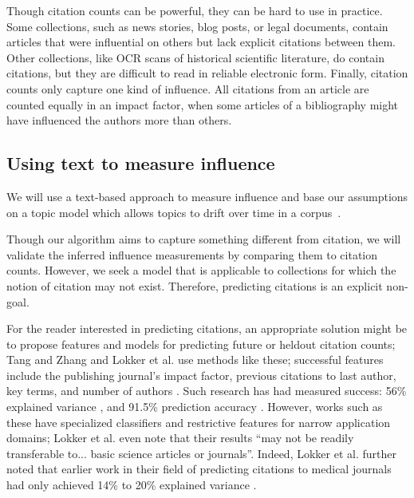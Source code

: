 Though citation counts can be powerful, they can be hard to use in
practice.  Some collections, such as news stories, blog posts, or
legal documents, contain articles that were influential on others but
lack explicit citations between them.  Other collections, like OCR
scans of historical scientific literature, do contain citations, but
they are difficult to read in reliable electronic form.  Finally,
citation counts only capture one kind of influence.  All citations
from an article are counted equally in an impact factor, when some
articles of a bibliography might have influenced the authors more than
others.

\subsection*{Using text to measure influence}

We will use a text-based approach to measure influence and base our
assumptions on a topic model which allows topics to drift over time in
a corpus~\cite{blei:2006}.

Though our algorithm aims to capture something different from
citation, we will validate the inferred influence measurements by
comparing them to citation counts.  However, we seek a model that is
applicable to collections for which the notion of citation may not
exist.  Therefore, predicting citations is an explicit non-goal. 

For the reader interested in predicting citations, an appropriate
solution might be to propose features and models for predicting future
or heldout citation counts; Tang and Zhang \cite{tang:2009} and Lokker
et al. \cite{lokker:2008} use methods like these; successful features
include the publishing journal's impact factor, previous citations to
last author, key terms, and number of authors
\cite{tang:2009,lokker:2008}.  Such research has had measured success:
56\% explained variance \cite{lokker:2008}, and 91.5\% prediction
accuracy \cite{ibanez:2009}.  However, works such as these have
specialized classifiers and restrictive features for narrow
application domains; Lokker et al. \cite{lokker:2008} even note that
their results ``may not be readily transferable to... basic science
articles or journals''. Indeed, Lokker et al.  further noted that
earlier work in their field of predicting citations to medical
journals had only achieved 14\% to 20\% explained variance
\cite{lokker:2008}.


